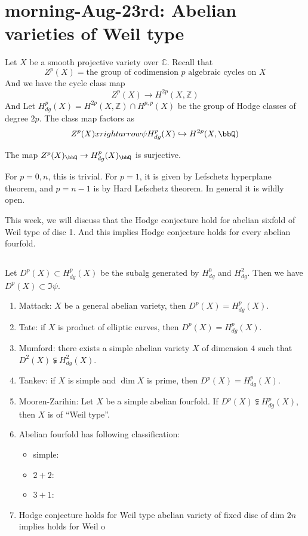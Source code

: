 \section{morning-Aug-23rd: Abelian varieties of Weil type}

Let $X$ be a smooth projective variety over $\mathbb{C}$.
Recall that
\[ Z^p(X) = \text{the group of codimension $p$ algebraic cycles on $X$} \]
And we have the cycle class map
\[ Z^p(X) \to H^{2p}(X, \mathbb{Z}) \]
And Let $H_{dg}^p(X) = H^{2p}(X, \mathbb{Z}) \cap H^{p,p}(X)$ be the group of Hodge classes of degree $2p$.
The class map factors as
\[ Z^p(X) \\xrightarrow{\psi} H_{dg}^p(X) \hookrightarrow H^{2p}(X, \bbQ) \]

\begin{conjecture}
	The map $Z^p(X)_\bbQ \to H_{dg}^p(X)_\bbQ$ is surjective.
\end{conjecture}

For $p = 0,n$, this is trivial.
For $p=1$, it is given by Lefschetz hyperplane theorem, and $p = n -1$ is by Hard Lefschetz theorem.
In general it is wildly open.

This week, we will discuss that the Hodge conjecture hold for abelian sixfold of Weil type of disc 1.
And this implies Hodge conjecture holds for every abelian fourfold.


\subsection{}

Let $D^p(X) \subset H_{dg}^p(X)$ be the subalg generated by $H_{dg}^0$ and $H_{dg}^2$.
Then we have $D^p(X) \subset \Im \psi$.
\begin{enumerate}
	\item Mattack: $X$ be a general abelian variety, then $D^p(X) = H_{dg}^p(X)$.
	\item Tate: if $X$ is product of elliptic curves, then $D^p(X) = H_{dg}^p(X)$.
	\item Mumford: there exists a simple abelian variety $X$ of dimension $4$ such that $D^2(X) \subsetneqq H_{dg}^2(X)$.
	\item Tankev: if $X$ is simple and $\dim X$ is prime, then $D^p(X) = H_{dg}^p(X)$.
	\item Mooren-Zarihin: Let $X$ be a simple abelian fourfold. If $D^p(X) \subsetneqq H^p_{dg}(X)$, then $X$ is of ``Weil type''.
	\item Abelian fourfold has following classification:
	      \begin{itemize}
		      \item simple:
		      \item $2+2$:
		      \item $3+1$:
	      \end{itemize}
	\item Hodge conjecture holds for Weil type abelian variety of fixed disc of dim $2n$ implies holds for Weil o \Yang{}
\end{enumerate}


